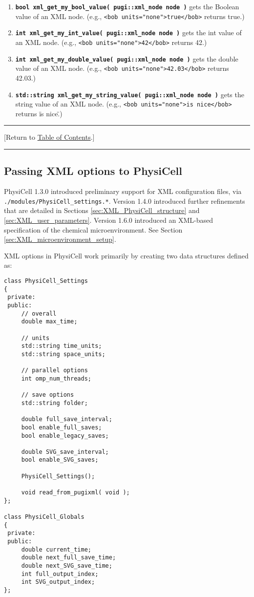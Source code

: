 \documentclass[12pt]{article}
\renewcommand{\v}{\verb}
\newcommand{\smallcode}[1]{\textbf{\texttt{#1}}}
\newcommand{\TOClink}{\begin{center}\hrule\vskip-5pt\phantom{.}\hfill[Return to \hyperlink{TOC}{Table of Contents}.]\hfill\phantom{.}\vskip3pt\hrule\end{center}}
\begin{document}
\begin{enumerate}
\item 
\smallcode{bool xml\_get\_my\_bool\_value( pugi::xml\_node node )} gets the Boolean value of an XML node. (e.g., \v|<bob units="none">true</bob>| returns true.) 


\item 
\smallcode{int xml\_get\_my\_int\_value( pugi::xml\_node node )} gets the int value of an XML node. (e.g., \v|<bob units="none">42</bob>| returns 42.) 
 

\item 
\smallcode{int xml\_get\_my\_double\_value( pugi::xml\_node node )} gets the double value of an XML node. (e.g., \v|<bob units="none">42.03</bob>| returns 42.03.) 
 

\item 
\smallcode{std::string xml\_get\_my\_string\_value( pugi::xml\_node node )} gets the string value of an XML node. (e.g., \v|<bob units="none">is nice</bob>| returns \"is nice\".) 




\end{enumerate}
\TOClink

\subsection{Passing XML options to PhysiCell}
\label{sec:XML_options}
PhysiCell 1.3.0 introduced preliminary support for XML configuration files, via \hfill\break
\v|./modules/PhysiCell_settings.*|. Version 1.4.0 introduced further refinements that are 
detailed in Sections \ref{sec:XML_PhysiCell_structure} and \ref{sec:XML_user_parameters}. 
Version 1.6.0 introduced an XML-based specification of the chemical microenvironment. 
See Section \ref{sec:XML_microenvironment_setup}. 

XML options in PhysiCell work  primarily  by creating two data 
structures defined as: 

\begin{verbatim}
class PhysiCell_Settings
{
 private:
 public:
     // overall 
     double max_time;   

     // units
     std::string time_units; 
     std::string space_units; 
 
     // parallel options 
     int omp_num_threads; 
     
     // save options
     std::string folder; 

     double full_save_interval;  
     bool enable_full_saves; 
     bool enable_legacy_saves; 
     
     double SVG_save_interval; 
     bool enable_SVG_saves; 
     
     PhysiCell_Settings();
     
     void read_from_pugixml( void ); 
};

class PhysiCell_Globals
{
 private:
 public:
     double current_time; 
     double next_full_save_time; 
     double next_SVG_save_time; 
     int full_output_index; 
     int SVG_output_index; 
};
\end{verbatim}
\end{document}
